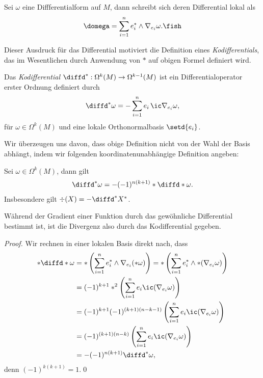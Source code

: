 \documentclass[%
	paper=a5,%
	fleqn,%
	DIV=18,%
	BCOR=0mm,
	fontsize=11pt,
	titlepage=false,%
	bibliography=totoc,
	DIV=18,%
	twoside=true,
	pdftitle=Riemannsche Geometrie,
	pdfauthor=Uwe Semmelmann,
	numbers=noendperiod]%
	{scrbook}
\begin{document}
\begin{lem}
Sei $\omega$ eine Diffferentialform auf $M$, dann schreibt sich deren Differential lokal als
\begin{align*}
\domega = \sum_{i=1}^n e_{i}^* \wedge \nabla_{e_{i}}\omega.\fish
\end{align*}
\end{lem}

Dieser Ausdruck für das Differential motiviert die Definition eines \textit{Kodifferentials}, das im Wesentlichen durch Anwendung von $*$ auf obigen Formel definiert wird.

\begin{defn}
Das \emph{Kodifferential} $\diffd^*: \Omega^k(M)\to \Omega^{k-1}(M)$ ist ein Differentialoperator erster Ordnung definiert durch
\begin{align*}
\diffd^*\omega = - \sum_{i=1}^n e_{i}\,\ic \nabla_{e_{i}}\omega,
\end{align*}
für $\omega\in\Omega^k(M)$ und eine lokale Orthonormalbasis $\setd{e_{i}}$.\fish
\end{defn}

Wir überzeugen uns davon, dass obige Definition nicht von der Wahl der Basis abhängt, indem wir folgenden koordinatenunabhängige Definition angeben:

\begin{lem}
\label{lem:Kodifferential-Hodge}
Sei $\omega\in\Omega^k(M)$, dann gilt
\begin{align*}
\diffd^*\omega = -(-1)^{n(k+1)}*\diffd*\omega.
\end{align*}
Insbesondere gilt $\div(X) = -\diffd^*X^*$.\fish
\end{lem}

Während der Gradient einer Funktion durch das gewöhnliche Differential bestimmt ist, ist die Divergenz also durch das Kodifferential gegeben.

\begin{proof}
Wir rechnen in einer lokalen Basis direkt nach, dass
\begin{align*}
*\diffd*\omega &= *\left(
\sum_{i=1}^n e_{i}^* \wedge \nabla_{e_{i}}(*\omega)\right)
= *\left(\sum_{i=1}^n e_{i}^*\wedge *(\nabla_{e_{i}}\omega)\right)\\
&= (-1)^{k+1}*^2
\left(\sum_{i=1}^n e_{i}\ic (\nabla_{e_{i}}\omega)\right)\\
&= (-1)^{k+1}(-1)^{(k+1)(n-k-1)}
\left(\sum_{i=1}^n e_{i}\ic (\nabla_{e_{i}}\omega)\right)\\
&= (-1)^{(k+1)(n-k)}
\left(\sum_{i=1}^n e_{i}\ic (\nabla_{e_{i}}\omega)\right)\\
&=
-(-1)^{n(k+1)}\diffd^* \omega,
\end{align*}
denn $(-1)^{k(k+1)} = 1$.\qed
\end{proof}
\end{document}
